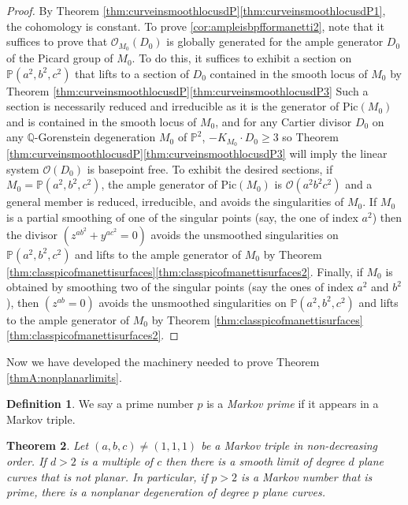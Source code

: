 \documentclass[JEP,XML,SOM,Unicode,NoFloatCountersInSection,published]{cedram}
\theoremstyle{plain}
\newtheorem{theorem}{Theorem}[section]
\theoremstyle{definition}
\newtheorem{definition}[theorem]{Definition}
\newcommand\PP{{\mathbb{P}}}
\newcommand\QQ{{\mathbb Q}}
\newcommand\Oc{{\mathcal O}}
\newcommand\Pic{{\mathrm{Pic}}}
\newcommand\Pabc{{\PP(a^2,b^2,c^2)}}
\begin{document}
\begin{proof}

By Theorem \ref{thm:curveinsmoothlocusdP}\eqref{thm:curveinsmoothlocusdP1}, the cohomology is constant. To prove \eqref{cor:ampleisbpfformanetti2}, note that it suffices to prove that $\Oc_{M_0}(D_0)$ is globally generated for the ample generator $D_0$ of the Picard group of $M_0$. To do this, it suffices to exhibit a section on $\Pabc$ that lifts to a section of $D_0$ contained in the smooth locus of $M_0$ by Theorem \ref{thm:curveinsmoothlocusdP}\eqref{thm:curveinsmoothlocusdP3} Such a section is necessarily reduced and irreducible as it is the generator of $\Pic(M_0)$ and is contained in the smooth locus of $M_0$, and for any Cartier divisor $D_0$ on any $\QQ$-Gorenstein degeneration $M_0$ of $\PP^2$, $-K_{M_0} \cdot D_0 \ge 3$ so Theorem \ref{thm:curveinsmoothlocusdP}\eqref{thm:curveinsmoothlocusdP3} will imply the linear system $\Oc(D_0)$ is basepoint free. To exhibit the desired sections, if $M_0 = \Pabc$, the ample generator of $\Pic(M_0)$ is $\Oc(a^2b^2c^2)$ and a general member is reduced, irreducible, and avoids the singularities of $M_0$. If $M_0$ is a partial smoothing of one of the singular points (say, the one of index $a^2$) then the divisor \hbox{$(z^{ab^2}+y^{ac^2}=0)$} avoids the unsmoothed singularities on $\Pabc$ and lifts to the ample generator of $M_0$ by Theorem \ref{thm:classpicofmanettisurfaces}\eqref{thm:classpicofmanettisurfaces2}. Finally, if $M_0$ is obtained by smoothing two of the singular points (say the ones of index $a^2$ and $b^2$), then $(z^{ab}=0)$ avoids the unsmoothed singularities on $\Pabc$ and lifts to the ample generator of $M_0$ by Theorem \ref{thm:classpicofmanettisurfaces}\eqref{thm:classpicofmanettisurfaces2}.
\end{proof}

Now we have developed the machinery needed to prove Theorem \ref{thmA:nonplanarlimits}.

\begin{definition}
We say a prime number $p$ is a \textit{Markov prime} if it appears in a Markov triple.
\end{definition}

\begin{theorem}\label{smoothlimits1}
Let $(a,b,c)\ne (1,1,1)$ be a Markov triple in non-decreasing order. If $d>2$ is a multiple of $c$ then there is a smooth limit of degree $d$ plane curves that is not planar. In particular, if $p>2$ is a Markov number that is prime, there is a nonplanar degeneration of degree $p$ plane curves.
\end{theorem}
\end{document}
